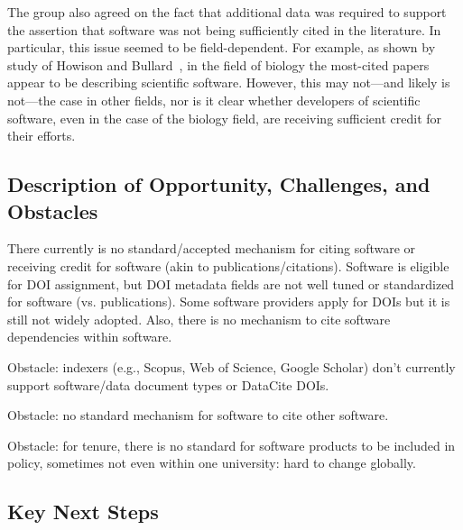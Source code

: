 The group also agreed on the fact that additional data was required to support the assertion that software was not being sufficiently cited in the literature.
In particular, this issue seemed to be field-dependent.
For example, as shown by study of Howison and Bullard~\cite{Howison2015}, in the field of biology the most-cited papers appear to be describing scientific software.
However, this may not---and likely is not---the case in other fields, nor is it clear whether developers of scientific software, even in the case of the biology field, are receiving sufficient credit for their efforts.




\subsection{Description of Opportunity, Challenges, and Obstacles}

There currently is no standard/accepted mechanism for citing software or receiving credit for software (akin to publications/citations).
Software is eligible for DOI assignment, but DOI metadata fields are not well tuned or standardized for software (vs. publications).
Some software providers apply for DOIs but it is still not widely adopted.
Also, there is no mechanism to cite software dependencies within software.

Obstacle: indexers (e.g., Scopus, Web of Science, Google Scholar) don't currently support software/data document types or DataCite DOIs.

Obstacle: no standard mechanism for software to cite other software.

Obstacle: for tenure, there is no standard for software products to be included in policy,
sometimes not even within one university: hard to change globally.

\subsection{Key Next Steps}

